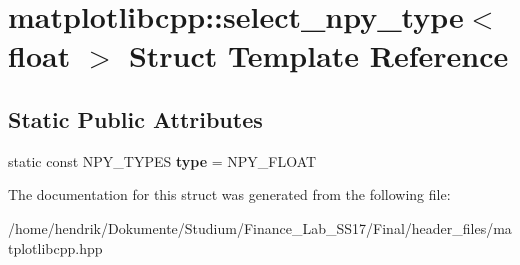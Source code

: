 \hypertarget{structmatplotlibcpp_1_1select__npy__type_3_01float_01_4}{}\section{matplotlibcpp\+:\+:select\+\_\+npy\+\_\+type$<$ float $>$ Struct Template Reference}
\label{structmatplotlibcpp_1_1select__npy__type_3_01float_01_4}
\subsection*{Static Public Attributes}
\begin{DoxyCompactItemize}
\item 
static const N\+P\+Y\+\_\+\+T\+Y\+P\+ES {\bfseries type} = N\+P\+Y\+\_\+\+F\+L\+O\+AT\hypertarget{structmatplotlibcpp_1_1select__npy__type_3_01float_01_4_a7bca025a3f0cb143e566e0f575bf7f6b}{}\label{structmatplotlibcpp_1_1select__npy__type_3_01float_01_4_a7bca025a3f0cb143e566e0f575bf7f6b}

\end{DoxyCompactItemize}


The documentation for this struct was generated from the following file\+:\begin{DoxyCompactItemize}
\item 
/home/hendrik/\+Dokumente/\+Studium/\+Finance\+\_\+\+Lab\+\_\+\+S\+S17/\+Final/header\+\_\+files/matplotlibcpp.\+hpp\end{DoxyCompactItemize}
